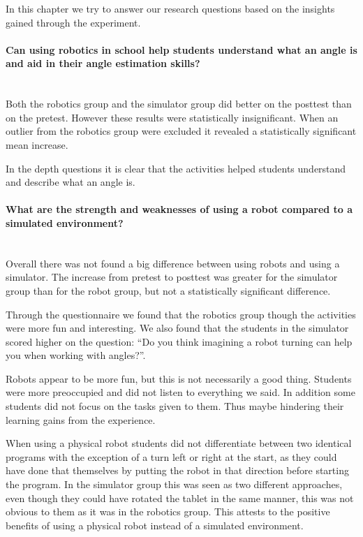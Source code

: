 In this chapter we try to answer our research questions based on the insights gained through the experiment. 

\paragraph{Can using robotics in school help students understand what an angle is and aid in their angle estimation skills?}~\\
Both the robotics group and the simulator group did better on the posttest than on the pretest. However these results were statistically insignificant. When an outlier from the robotics group were excluded it revealed a statistically significant mean increase. 

In the depth questions it is clear that the activities helped students understand and describe what an angle is. 

\paragraph{What are the strength and weaknesses of using a robot compared to a simulated environment?}~\\
Overall there was not found a big difference between using robots and using a simulator.
The increase from pretest to posttest was greater for the simulator group than for the robot group, but not a statistically significant difference. 

Through the questionnaire we found that the robotics group though the activities were more fun and interesting. We also found that the students in the simulator scored higher on the question: ``Do you think imagining a robot turning can help you
when working with angles?''. 

Robots appear to be more fun, but this is not necessarily a good thing. Students were more preoccupied and did not listen to everything we said. In addition some students did not focus on the tasks given to them. Thus maybe hindering their learning gains from the experience. 

When using a physical robot students did not differentiate between two identical programs with the exception of a turn left or right at the start, as they could have done that themselves by putting the robot in that direction before starting the program. In the simulator group this was seen as two different approaches, even though they could have rotated the tablet in the same manner, this was not obvious to them as it was in the robotics group. This attests to the positive benefits of using a physical robot instead of a simulated environment. 

